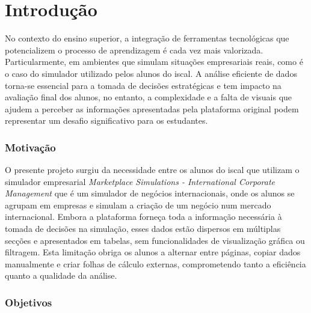 

\chapter{Introdução}
\label{ch:introducao}


No contexto do ensino superior, a integração de ferramentas tecnológicas que potencializem o processo de aprendizagem é cada vez mais valorizada. Particularmente, em ambientes que simulam situações empresariais reais, como é o caso do simulador utilizado pelos alunos do \gls{iscal}.  A análise eficiente de dados torna-se essencial para a tomada de decisões estratégicas e tem impacto na avaliação final dos alunos, no entanto, a complexidade e a falta de visuais que ajudem a perceber as informações apresentadas pela plataforma original podem representar um desafio significativo para os estudantes.

\subsection{Motivação}
O presente projeto surgiu da necessidade  entre os alunos do \gls{iscal} que utilizam o simulador empresarial \textit{Marketplace Simulations - International Corporate Management} que é um simulador de negócios internacionais, onde os alunos se agrupam em empresas e simulam a criação de um negócio num mercado internacional. Embora a plataforma forneça toda a informação necessária à tomada de decisões na simulação, esses dados estão dispersos em múltiplas secções e apresentados em tabelas, sem funcionalidades de visualização gráfica ou filtragem. Esta limitação obriga os alunos a alternar entre páginas, copiar dados manualmente e criar folhas de cálculo externas, comprometendo tanto a eficiência quanto a qualidade da análise.


\subsection{Objetivos}

